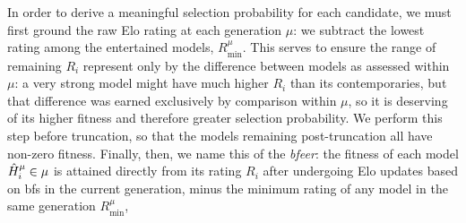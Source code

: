     

\par 
In order to derive a meaningful selection probability for each candidate, 
    we must first ground the raw Elo rating at each generation $\mu$:
    we subtract the lowest rating among the entertained models, $R_{\textrm{min}}^{\mu}$.
This serves to ensure the range of remaining $R_i$ represent only by the difference between
    models as assessed within $\mu$: 
    a very strong model might have much higher $R_i$ than its contemporaries, 
    but that difference was earned exclusively by comparison within $\mu$, 
    so it is deserving of its higher fitness and therefore greater selection probability. 
We perform this step before truncation\footnotemark, so that the models remaining post-truncation
    all have non-zero fitness. 
Finally, then, we name this \gls{of} the \emph{\gls{bfeer}}:
    the fitness of each model $\hat{H}_i^{\mu} \in \mu$ is attained directly from its rating $R_i$
    after undergoing Elo updates based on \glspl{bf} in the current generation, minus the minimum rating of any model 
    in the same generation $R^{\mu}_{\textrm{min}}$,

